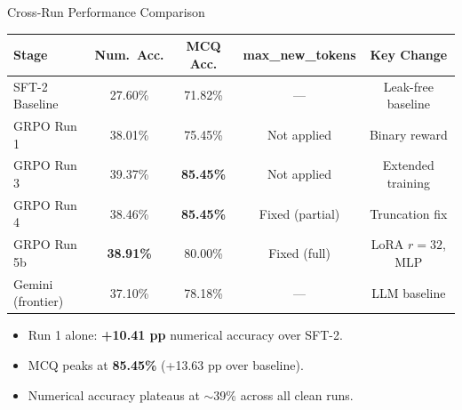 \documentclass[10pt]{beamer}
\renewcommand{\footnotesize}{\tiny}
\begin{document}
\begin{frame}{Cross-Run Performance Comparison}
\begin{center}
\footnotesize
\begin{tabular}{lcccc}
    \toprule
    \textbf{Stage} & \textbf{Num.\ Acc.} & \textbf{MCQ Acc.} & \textbf{max\_new\_tokens} & \textbf{Key Change} \\
    \midrule
    SFT-2 Baseline & 27.60\% & 71.82\% & --- & Leak-free baseline \\
    GRPO Run 1 & 38.01\% & 75.45\% & Not applied & Binary reward \\
    GRPO Run 3 & 39.37\% & \textbf{85.45\%} & Not applied & Extended training \\
    GRPO Run 4 & 38.46\% & \textbf{85.45\%} & Fixed (partial) & Truncation fix \\
    GRPO Run 5b & \textbf{38.91\%} & 80.00\% & Fixed (full) & LoRA $r=32$, MLP \\
    \midrule
    Gemini (frontier) & 37.10\% & 78.18\% & --- & LLM baseline \\
    \bottomrule
\end{tabular}
\end{center}

\vspace{0.3cm}
\large
\begin{itemize}
    \item Run 1 alone: \textbf{+10.41 pp} numerical accuracy over SFT-2.
    \item MCQ peaks at \textbf{85.45\%} (+13.63 pp over baseline).
    \item Numerical accuracy plateaus at $\sim$39\% across all clean runs.
\end{itemize}
\end{frame}
\end{document}
